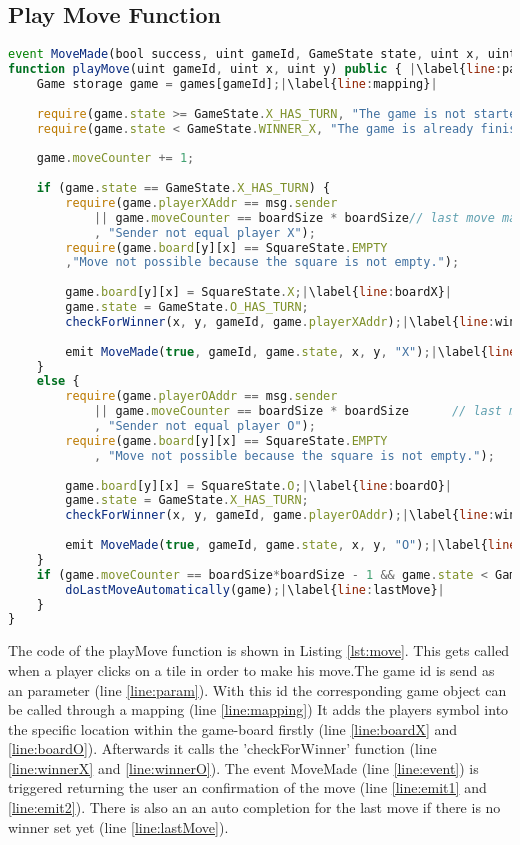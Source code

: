 \subsection{Play Move Function}\label{subsec:move}
	\begin{lstlisting}[caption={Play Move Function on the Smart Contract}, label={lst:move},language=JavaScript,escapechar=|]
event MoveMade(bool success, uint gameId, GameState state, uint x, uint y, string symbol);|\label{line:event}| 
function playMove(uint gameId, uint x, uint y) public { |\label{line:param}| 
	Game storage game = games[gameId];|\label{line:mapping}|
		    
	require(game.state >= GameState.X_HAS_TURN, "The game is not started yet.");
	require(game.state < GameState.WINNER_X, "The game is already finished.");
		    
	game.moveCounter += 1;
		    
	if (game.state == GameState.X_HAS_TURN) {
		require(game.playerXAddr == msg.sender
			|| game.moveCounter == boardSize * boardSize// last move made 	automatically
			, "Sender not equal player X");
		require(game.board[y][x] == SquareState.EMPTY
		,"Move not possible because the square is not empty.");
		    
		game.board[y][x] = SquareState.X;|\label{line:boardX}|
		game.state = GameState.O_HAS_TURN;
		checkForWinner(x, y, gameId, game.playerXAddr);|\label{line:winnerX}|
		    
		emit MoveMade(true, gameId, game.state, x, y, "X");|\label{line:emit1}|
	}
	else {
		require(game.playerOAddr == msg.sender
			|| game.moveCounter == boardSize * boardSize      // last move made automatically
			, "Sender not equal player O");
		require(game.board[y][x] == SquareState.EMPTY
			, "Move not possible because the square is not empty.");
		    
		game.board[y][x] = SquareState.O;|\label{line:boardO}|
		game.state = GameState.X_HAS_TURN;
		checkForWinner(x, y, gameId, game.playerOAddr);|\label{line:winnerO}|
		    
		emit MoveMade(true, gameId, game.state, x, y, "O");|\label{line:emit2}|
	}
	if (game.moveCounter == boardSize*boardSize - 1 && game.state < GameState.WINNER_X) {
		doLastMoveAutomatically(game);|\label{line:lastMove}|
	}
}
\end{lstlisting}
The code of the playMove function is shown in Listing \ref{lst:move}. This gets called when a player clicks on a tile in order to make his move.The game id is send as an parameter (line \ref{line:param}). With this id the corresponding game object can be called through a mapping (line \ref{line:mapping})  It adds the players symbol into the specific location within the game-board firstly (line \ref{line:boardX} and \ref{line:boardO}). Afterwards it calls the 'checkForWinner' function (line \ref{line:winnerX} and \ref{line:winnerO}). The event MoveMade (line \ref{line:event}) is triggered returning the user an confirmation of the move (line \ref{line:emit1} and \ref{line:emit2}). There is also an an auto completion for the last move if there is no winner set yet (line \ref{line:lastMove}).


